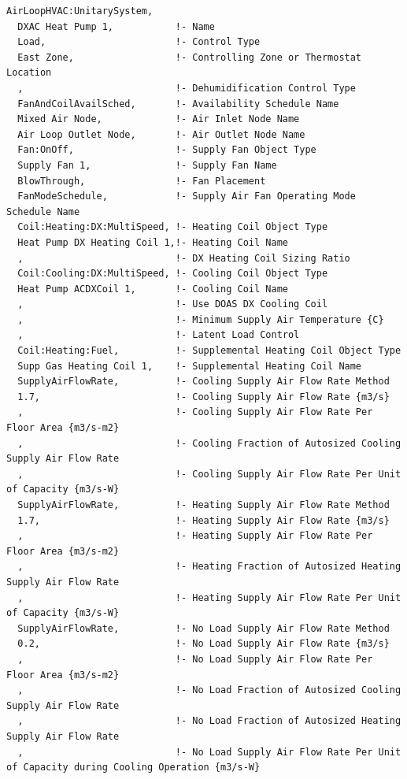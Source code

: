 \begin{lstlisting}
AirLoopHVAC:UnitarySystem,
  DXAC Heat Pump 1,           !- Name
  Load,                       !- Control Type
  East Zone,                  !- Controlling Zone or Thermostat Location
  ,                           !- Dehumidification Control Type
  FanAndCoilAvailSched,       !- Availability Schedule Name
  Mixed Air Node,             !- Air Inlet Node Name
  Air Loop Outlet Node,       !- Air Outlet Node Name
  Fan:OnOff,                  !- Supply Fan Object Type
  Supply Fan 1,               !- Supply Fan Name
  BlowThrough,                !- Fan Placement
  FanModeSchedule,            !- Supply Air Fan Operating Mode Schedule Name
  Coil:Heating:DX:MultiSpeed, !- Heating Coil Object Type
  Heat Pump DX Heating Coil 1,!- Heating Coil Name
  ,                           !- DX Heating Coil Sizing Ratio
  Coil:Cooling:DX:MultiSpeed, !- Cooling Coil Object Type
  Heat Pump ACDXCoil 1,       !- Cooling Coil Name
  ,                           !- Use DOAS DX Cooling Coil
  ,                           !- Minimum Supply Air Temperature {C}
  ,                           !- Latent Load Control
  Coil:Heating:Fuel,          !- Supplemental Heating Coil Object Type
  Supp Gas Heating Coil 1,    !- Supplemental Heating Coil Name
  SupplyAirFlowRate,          !- Cooling Supply Air Flow Rate Method
  1.7,                        !- Cooling Supply Air Flow Rate {m3/s}
  ,                           !- Cooling Supply Air Flow Rate Per Floor Area {m3/s-m2}
  ,                           !- Cooling Fraction of Autosized Cooling Supply Air Flow Rate
  ,                           !- Cooling Supply Air Flow Rate Per Unit of Capacity {m3/s-W}
  SupplyAirFlowRate,          !- Heating Supply Air Flow Rate Method
  1.7,                        !- Heating Supply Air Flow Rate {m3/s}
  ,                           !- Heating Supply Air Flow Rate Per Floor Area {m3/s-m2}
  ,                           !- Heating Fraction of Autosized Heating Supply Air Flow Rate
  ,                           !- Heating Supply Air Flow Rate Per Unit of Capacity {m3/s-W}
  SupplyAirFlowRate,          !- No Load Supply Air Flow Rate Method
  0.2,                        !- No Load Supply Air Flow Rate {m3/s}
  ,                           !- No Load Supply Air Flow Rate Per Floor Area {m3/s-m2}
  ,                           !- No Load Fraction of Autosized Cooling Supply Air Flow Rate
  ,                           !- No Load Fraction of Autosized Heating Supply Air Flow Rate
  ,                           !- No Load Supply Air Flow Rate Per Unit of Capacity during Cooling Operation {m3/s-W}

\end{lstlisting}
